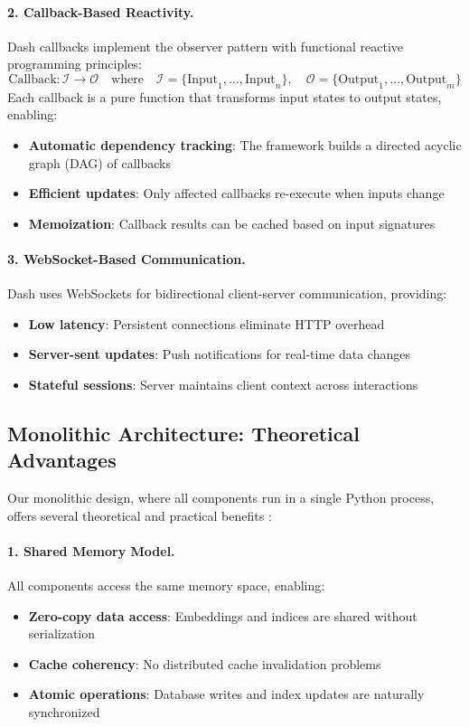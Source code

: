 \paragraph{2. Callback-Based Reactivity.} Dash callbacks implement the observer pattern \cite{gamma1994design} with functional reactive programming principles:
\[
\text{Callback}: \mathcal{I} \rightarrow \mathcal{O} \quad \text{where} \quad \mathcal{I} = \{\text{Input}_1, \ldots, \text{Input}_n\}, \quad \mathcal{O} = \{\text{Output}_1, \ldots, \text{Output}_m\}
\]
Each callback is a pure function that transforms input states to output states, enabling:
\begin{itemize}[leftmargin=*,itemsep=2pt,topsep=2pt]
 \item \textbf{Automatic dependency tracking}: The framework builds a directed acyclic graph (DAG) of callbacks
 \item \textbf{Efficient updates}: Only affected callbacks re-execute when inputs change
 \item \textbf{Memoization}: Callback results can be cached based on input signatures
\end{itemize}

\paragraph{3. WebSocket-Based Communication.} Dash uses WebSockets \cite{fette2011websocket} for bidirectional client-server communication, providing:
\begin{itemize}[leftmargin=*,itemsep=2pt,topsep=2pt]
 \item \textbf{Low latency}: Persistent connections eliminate HTTP overhead
 \item \textbf{Server-sent updates}: Push notifications for real-time data changes
 \item \textbf{Stateful sessions}: Server maintains client context across interactions
\end{itemize}

\subsection{Monolithic Architecture: Theoretical Advantages}

Our monolithic design, where all components run in a single Python process, offers several theoretical and practical benefits \cite{newman2015building}:

\paragraph{1. Shared Memory Model.} All components access the same memory space, enabling:
\begin{itemize}[leftmargin=*,itemsep=2pt,topsep=2pt]
 \item \textbf{Zero-copy data access}: Embeddings and indices are shared without serialization
 \item \textbf{Cache coherency}: No distributed cache invalidation problems
 \item \textbf{Atomic operations}: Database writes and index updates are naturally synchronized
\end{itemize}

